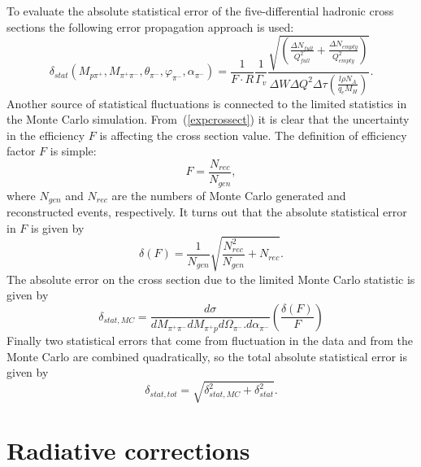 To evaluate 
the absolute statistical error of the five-differential
 hadronic cross sections the following error
 propagation approach is used:
 \begin{equation}
\delta_{stat}(M_{p\pi^{+}},M_{\pi^{+}\pi^{-}},\theta_{\pi^{-}},\varphi_{\pi^{-}},
\alpha_{\pi^{-}}) = \frac{1}{F \cdot R} 
\frac{1}{ \Gamma_{v} }
\frac{\sqrt{\left( \frac{\Delta
N_{full}}{Q_{full}^{2}}+\frac{\Delta N_{empty}}{Q_{empty}^{2}} \right) } }{
\Delta W \Delta Q^{2} \Delta \tau \left( \frac{l \rho N_{A}}{q_{e}M_{H}} \right)}.
\label{staterrors}
\end{equation}
Another source of statistical fluctuations is connected to the limited statistics in the
Monte Carlo simulation. From~(\ref{expcrossect}) it is clear that the uncertainty in the
 efficiency $F$ is affecting the cross section value.
The definition of efficiency factor $F$ is simple:
\begin{equation}
F = \frac{N_{rec}}{N_{gen}},
\label{efficiency}
\end{equation}
where $N_{gen}$ and $N_{rec}$ are the numbers of Monte Carlo generated and reconstructed events, respectively.
It turns out that the absolute statistical error in $F$ is given by
\begin{equation}
\delta(F) =
\frac{1}{N_{gen}}\sqrt{\frac{N_{rec}^{2}}{N_{gen}} + N_{rec}}.
\label{efferror}
\end{equation}
The absolute error on the cross section due to the limited Monte Carlo statistic is given by
\begin{equation}
\delta_{stat,MC} = \frac{d\sigma}{dM_{\pi^{+}\pi^{-}}dM_{\pi^{+}p}d\Omega_{\pi^{-}}.
d\alpha_{\pi^{-}}} \left( \frac{\delta(F)}{F} \right)
\label{montecarloerror}
\end{equation}
Finally two statistical errors that come from
fluctuation in the data and from the Monte Carlo are combined quadratically, so the total absolute statistical error is given by
\begin{equation}
\delta_{stat,tot} =
\sqrt{\delta_{stat,MC}^{2} +
\delta_{stat}^{2}}.
\label{errortot}
\end{equation}

\section{Radiative corrections}
\label{radiative}

